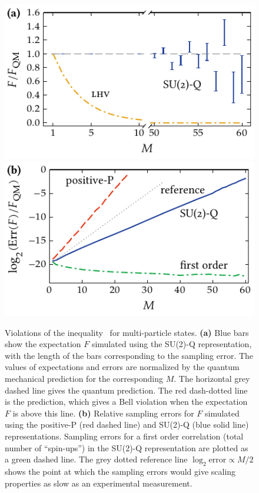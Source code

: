 \begin{figure}
    \centerline{%
    \includegraphics{figures_generated/bell/ghz_violations.pdf}%
    \includegraphics{figures_generated/bell/ghz_errors.pdf}}

    \caption[Violation of Bell inequality in  states]{
    Violations of the inequality~ for multi-particle  states.
    \textbf{(a)} Blue bars show the expectation $F$ simulated using the SU(2)-Q representation, with the length of the bars corresponding to the sampling error.
    The values of expectations and errors are normalized by the quantum mechanical prediction for the corresponding $M$.
    The horizontal grey dashed line gives the quantum prediction.
    The red dash-dotted line is the  prediction, which gives a Bell violation when the expectation $F$ is above this line.
    \textbf{(b)} Relative sampling errors for $F$ simulated using the positive-P (red dashed line) and SU(2)-Q (blue solid line) representations.
    Sampling errors for a first order correlation (total number of ``spin-ups'') in the SU(2)-Q representation are plotted as a green dashed line.
    The grey dotted reference line $\log_2 \mathrm{error} \propto M / 2$ shows the point at which the sampling errors would give scaling properties as slow as an experimental measurement.}%

    \label{fig:bell-ineq:ghz:violation}
\end{figure}

